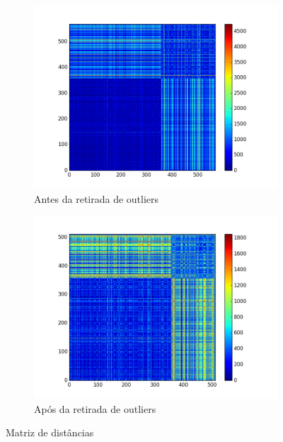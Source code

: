 \documentclass[11pt,a4paper]{article}
\numberwithin{equation}{section}
\begin{document}
\begin{figure}[H]
\centering
\begin{subfigure}{.5\textwidth}
  \centering
  \includegraphics[width=\linewidth]{../img/distance_out}
  \caption{Antes da retirada de outliers}
  \label{fig:antes_out}
\end{subfigure}%
\begin{subfigure}{.5\textwidth}
  \centering
  \includegraphics[width=\linewidth]{../img/distance_clean}
  \caption{Após da retirada de outliers}
  \label{fig:apos_out}
\end{subfigure}
\caption{Matriz de distâncias}
\label{fig:distorig}
\end{figure}
\end{document}
